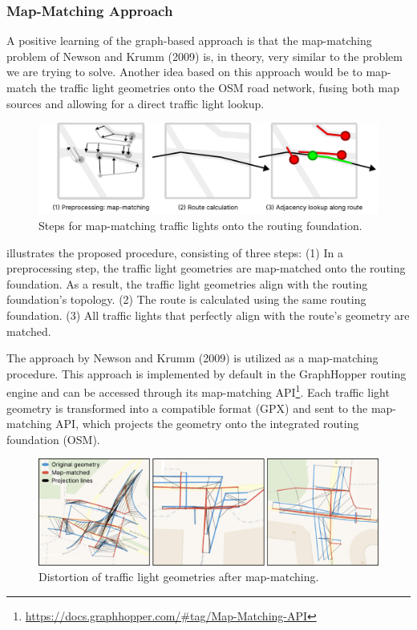 \subsubsection{Map-Matching Approach}

A positive learning of the graph-based approach is that the map-matching problem of Newson and Krumm (2009) \cite{newson_hidden_2009} is, in theory, very similar to the problem we are trying to solve. Another idea based on this approach would be to map-match the traffic light geometries onto the OSM road network, fusing both map sources and allowing for a direct traffic light lookup.

\begin{figure}[t]
\centering
\includegraphics[width=\linewidth]{images/sg-selection-map-matching-approach.pdf}
\caption{Steps for map-matching traffic lights onto the routing foundation.}
\label{fig:sg-selection-map-matching-approach}
\end{figure}

 illustrates the proposed procedure, consisting of three steps: (1) In a preprocessing step, the traffic light geometries are map-matched onto the routing foundation. As a result, the traffic light geometries align with the routing foundation's topology. (2) The route is calculated using the same routing foundation. (3) All traffic lights that perfectly align with the route's geometry are matched.

The approach by Newson and Krumm (2009) \cite{newson_hidden_2009} is utilized as a map-matching procedure. This approach is implemented by default in the GraphHopper routing engine and can be accessed through its map-matching API\footnote{\url{https://docs.graphhopper.com/\#tag/Map-Matching-API}}. Each traffic light geometry is transformed into a compatible format (GPX) and sent to the map-matching API, which projects the geometry onto the integrated routing foundation (OSM).

\begin{figure}[t]
\centering
\includegraphics[width=\linewidth]{images/sg-selection-map-matching-fails.pdf}
\caption{Distortion of traffic light geometries after map-matching.}
\label{fig:sg-selection-map-matching-fails}
\end{figure}

